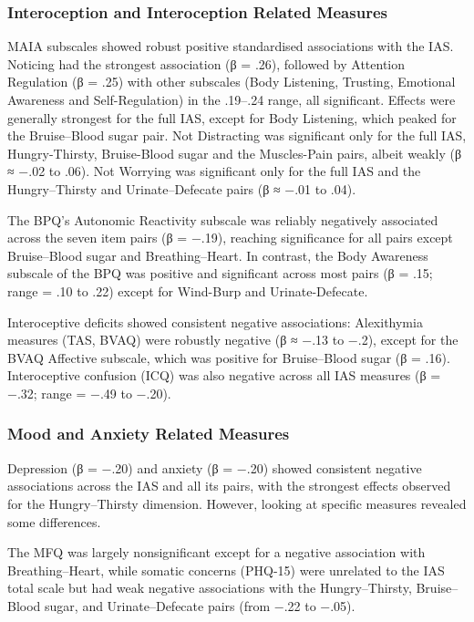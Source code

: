 \documentclass[
  jou,
  floatsintext,
  longtable,
  nolmodern,
  notxfonts,
  notimes,
  colorlinks=true,linkcolor=blue,citecolor=blue,urlcolor=blue]{apa7}
\begin{document}
\subsubsection{Interoception and Interoception Related
Measures}\label{interoception-and-interoception-related-measures-1}

MAIA subscales showed robust positive standardised associations with the
IAS. Noticing had the strongest association (β = .26), followed by
Attention Regulation (β = .25) with other subscales (Body Listening,
Trusting, Emotional Awareness and Self-Regulation) in the .19--.24
range, all significant. Effects were generally strongest for the full
IAS, except for Body Listening, which peaked for the Bruise--Blood sugar
pair. Not Distracting was significant only for the full IAS,
Hungry-Thirsty, Bruise-Blood sugar and the Muscles-Pain pairs, albeit
weakly (β ≈ −.02 to .06). Not Worrying was significant only for the full
IAS and the Hungry--Thirsty and Urinate--Defecate pairs (β ≈ −.01 to
.04).

The BPQ's Autonomic Reactivity subscale was reliably negatively
associated across the seven item pairs (β = −.19), reaching significance
for all pairs except Bruise--Blood sugar and Breathing--Heart. In
contrast, the Body Awareness subscale of the BPQ was positive and
significant across most pairs (β = .15; range = .10 to .22) except for
Wind-Burp and Urinate-Defecate.

Interoceptive deficits showed consistent negative associations:
Alexithymia measures (TAS, BVAQ) were robustly negative (β ≈ −.13 to
−.2), except for the BVAQ Affective subscale, which was positive for
Bruise--Blood sugar (β = .16). Interoceptive confusion (ICQ) was also
negative across all IAS measures (β = −.32; range = −.49 to −.20).

\subsubsection{Mood and Anxiety Related
Measures}\label{mood-and-anxiety-related-measures-1}

Depression (β = −.20) and anxiety (β = −.20) showed consistent negative
associations across the IAS and all its pairs, with the strongest
effects observed for the Hungry--Thirsty dimension. However, looking at
specific measures revealed some differences.

The MFQ was largely nonsignificant except for a negative association
with Breathing--Heart, while somatic concerns (PHQ-15) were unrelated to
the IAS total scale but had weak negative associations with the
Hungry--Thirsty, Bruise--Blood sugar, and Urinate--Defecate pairs (from
−.22 to −.05).
\end{document}
